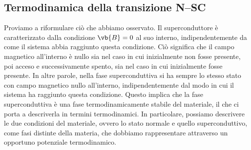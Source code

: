 \subsection{Termodinamica della transizione N--SC}
Proviamo a riformulare ciò che abbiamo osservato. Il superconduttore è caratterizzato dalla condizione $\vb{B}=0$ al suo interno, indipendentemente da come il sistema abbia raggiunto questa condizione. Ciò significa che il campo magnetico all'interno è nullo sia nel caso in cui inizialmente non fosse presente, poi acceso e successivamente spento, sia nel caso in cui inizialmente fosse presente. In altre parole, nella fase superconduttiva si ha sempre lo stesso stato con campo magnetico nullo all'interno, indipendentemente dal modo in cui il sistema ha raggiunto questa condizione. Questo implica che la fase superconduttiva è una fase termodinamicamente stabile del materiale, il che ci porta a descriverla in termini termodinamici. In particolare, possiamo descrivere le due condizioni del materiale, ovvero lo stato normale e quello superconduttivo, come fasi distinte della materia, che dobbiamo rappresentare attraverso un opportuno potenziale termodinamico.\\
